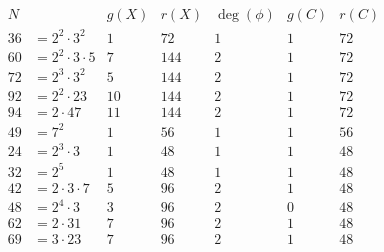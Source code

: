 \documentclass{amsart}
\numberwithin{equation}{section}
\theoremstyle{definition}
\begin{document}
\begin{table}[ht]
	\[
	\begin{array}{|rl|c|r|r|c|r|}
		\hline
		N & & g(X) & r(X) & \deg(\phi) & g(C) & r(C)\\
		\hline
36&= 2^{2} \cdot 3^{2} & 1 & 72 & 1 & 1 & 72 \\
60&= 2^{2} \cdot 3 \cdot 5 & 7 & 144 & 2 & 1 & 72 \\
72&= 2^{3} \cdot 3^{2} & 5 & 144 & 2 & 1 & 72 \\
92&= 2^{2} \cdot 23 & 10 & 144 & 2 & 1 & 72 \\
94&= 2 \cdot 47 & 11 & 144 & 2 & 1 & 72 \\
49&= 7^{2} & 1 & 56 & 1 & 1 & 56 \\
24&= 2^{3} \cdot 3 & 1 & 48 & 1 & 1 & 48 \\
32&= 2^{5} & 1 & 48 & 1 & 1 & 48 \\
42&= 2 \cdot 3 \cdot 7 & 5 & 96 & 2 & 1 & 48 \\
48&= 2^{4} \cdot 3 & 3 & 96 & 2 & 0 & 48 \\
62&= 2 \cdot 31 & 7 & 96 & 2 & 1 & 48 \\
69&= 3 \cdot 23 & 7 & 96 & 2 & 1 & 48 \\

\end{array}\]
\end{table}
\end{document}
